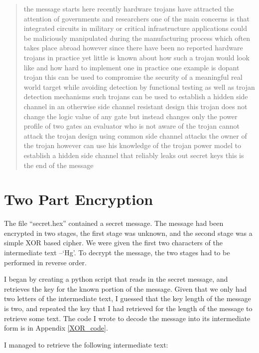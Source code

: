 \documentclass[11pt,a4paper,twoside]{article}
\begin{document}
\begin{quote}
\small
\raggedright
the message starts here recently hardware trojans have attracted the attention
of governments and researchers one of the main concerns is that integrated
circuits in military or critical infrastructure applications could be
maliciously manipulated during the manufacturing process which often takes
place abroad however since there have been no reported hardware trojans in
practice yet little is known about how such a trojan would look like and how
hard to implement one in practice one example is dopant trojan this can be used
to compromise the security of a meaningful real world target while avoiding
detection by functional testing as well as trojan detection mechanisms such
trojans can be used to establish a hidden side channel in an otherwise side
channel resistant design this trojan does not change the logic value of any
gate but instead changes only the power profile of two gates an evaluator who
is not aware of the trojan cannot attack the trojan design using common side
channel attacks the owner of the trojan however can use his knowledge of the
trojan power model to establish a hidden side channel that reliably leaks out
secret keys this is the end of the message
\end{quote}
 


\vfill
\pagebreak
\section{Two Part Encryption}
The file ``secret.hex'' contained a secret message. The message had been
encrypted in two stages, the first stage was unknown, and the second stage was
a simple XOR based cipher. We were given the first two characters of the
intermediate text --`Hg'. To decrypt the message, the two stages had to be
performed in reverse order.

I began by creating a python script that reads in the secret message, and
retrieves the key for the known portion of the message. Given that we only
had two letters of the intermediate text, I guessed that the key length of the
message is two, and repeated the key that I had retrieved for the length of
the message to retrieve some text. The code I wrote to decode the
message into its intermediate form is in Appendix \ref{XOR_code}.


I managed to retrieve the following intermediate text: 
\end{document}
